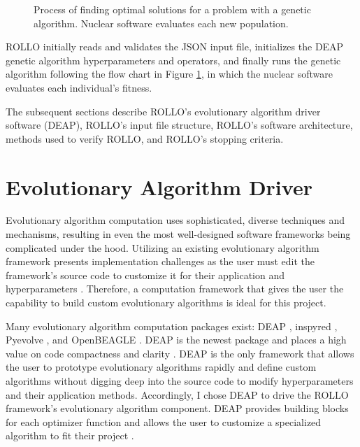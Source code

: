 \begin{figure}[htbp]
    \caption{Process of finding optimal solutions for a problem with a 
    genetic algorithm. Nuclear software evaluates each new population.}
    \label{fig:genetic_alg_nuclear}
\end{figure}
\gls{ROLLO} initially reads and validates the JSON input 
file, initializes the \gls{DEAP} \cite{fortin_deap_2012} genetic algorithm 
hyperparameters and operators, and finally runs the genetic algorithm following 
the flow chart in Figure \ref{fig:genetic_alg_nuclear}, in which the nuclear 
software evaluates each individual's fitness. 

The subsequent sections describe \gls{ROLLO}'s evolutionary algorithm driver 
software (DEAP), \gls{ROLLO}'s input file structure, \gls{ROLLO}'s software 
architecture, methods used to verify \gls{ROLLO}, and \gls{ROLLO}'s stopping 
criteria. 

\section{Evolutionary Algorithm Driver}
Evolutionary algorithm computation uses sophisticated, diverse techniques 
and mechanisms, resulting in even the most well-designed software frameworks 
being complicated under the hood. 
Utilizing an existing evolutionary algorithm framework presents implementation 
challenges as the user must edit the framework's source code to customize it for their 
application and hyperparameters \cite{fortin_deap_2012}. 
Therefore, a computation framework that gives the user the capability to build 
custom evolutionary algorithms is ideal for this project.

Many evolutionary algorithm computation packages exist: 
\gls{DEAP} \cite{fortin_deap_2012}, inspyred \cite{garrett_inspyred_2014}, 
Pyevolve \cite{perone_pyevolve_2009}, and OpenBEAGLE \cite{gagne_open_2002}.
\gls{DEAP} is the newest package and places a high value on code 
compactness and clarity \cite{fortin_deap_2012}. 
\gls{DEAP} is the only framework that allows the user to prototype evolutionary 
algorithms rapidly and define custom algorithms without digging deep into 
the source code to modify hyperparameters and their application methods.
Accordingly, I chose \gls{DEAP} to drive the \gls{ROLLO} framework's 
evolutionary algorithm component. 
\gls{DEAP} provides building blocks for each optimizer function and allows the 
user to customize a specialized algorithm to fit their project \cite{fortin_deap_2012}.

